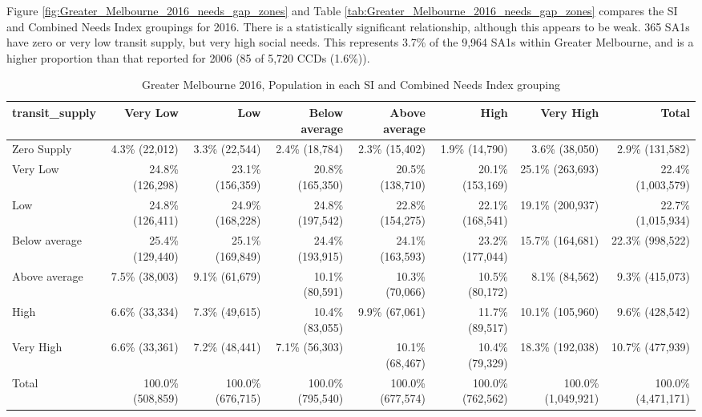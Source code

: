\documentclass[preprint, 3p,
authoryear]{elsarticle} %
\begin{document}
Figure \ref{fig:Greater_Melbourne_2016_needs_gap_zones} and Table
\ref{tab:Greater_Melbourne_2016_needs_gap_zones} compares the SI and
Combined Needs Index groupings for 2016. There is a statistically
significant relationship, although this appears to be weak. 365 SA1s
have zero or very low transit supply, but very high social needs. This
represents 3.7\% of the 9,964 SA1s within Greater Melbourne, and is a
higher proportion than that reported for 2006 (85 of 5,720 CCDs
(1.6\%)).

\begin{table}

\caption{\label{tab:Greater_Melbourne_2016_needs_gap_population}Greater Melbourne 2016, Population in each SI and Combined Needs Index grouping}
\centering
\fontsize{7}{9}\selectfont
\begin{tabular}[t]{l|r|r|r|r|r|r|r}
\hline
transit\_supply & Very Low & Low & Below average & Above average & High & Very High & Total\\
\hline
Zero Supply & 4.3\%  (22,012) & 3.3\%  (22,544) & 2.4\%  (18,784) & 2.3\%  (15,402) & 1.9\%  (14,790) & 3.6\%    (38,050) & 2.9\%   (131,582)\\
\hline
Very Low & 24.8\% (126,298) & 23.1\% (156,359) & 20.8\% (165,350) & 20.5\% (138,710) & 20.1\% (153,169) & 25.1\%   (263,693) & 22.4\% (1,003,579)\\
\hline
Low & 24.8\% (126,411) & 24.9\% (168,228) & 24.8\% (197,542) & 22.8\% (154,275) & 22.1\% (168,541) & 19.1\%   (200,937) & 22.7\% (1,015,934)\\
\hline
Below average & 25.4\% (129,440) & 25.1\% (169,849) & 24.4\% (193,915) & 24.1\% (163,593) & 23.2\% (177,044) & 15.7\%   (164,681) & 22.3\%   (998,522)\\
\hline
Above average & 7.5\%  (38,003) & 9.1\%  (61,679) & 10.1\%  (80,591) & 10.3\%  (70,066) & 10.5\%  (80,172) & 8.1\%    (84,562) & 9.3\%   (415,073)\\
\hline
High & 6.6\%  (33,334) & 7.3\%  (49,615) & 10.4\%  (83,055) & 9.9\%  (67,061) & 11.7\%  (89,517) & 10.1\%   (105,960) & 9.6\%   (428,542)\\
\hline
Very High & 6.6\%  (33,361) & 7.2\%  (48,441) & 7.1\%  (56,303) & 10.1\%  (68,467) & 10.4\%  (79,329) & 18.3\%   (192,038) & 10.7\%   (477,939)\\
\hline
Total & 100.0\% (508,859) & 100.0\% (676,715) & 100.0\% (795,540) & 100.0\% (677,574) & 100.0\% (762,562) & 100.0\% (1,049,921) & 100.0\% (4,471,171)\\
\hline
\end{tabular}
\end{table}
\end{document}
